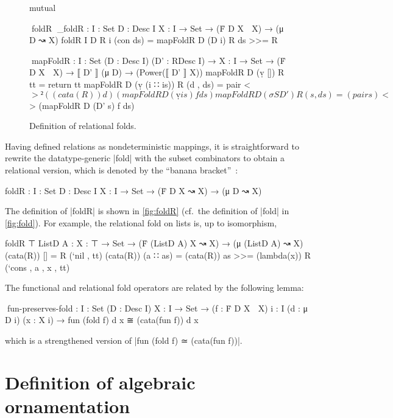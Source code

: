 \begin{figure}
\codefigure
\begin{code}
mutual

  ^^^foldR ^^^_foldR :  {I : Set} {D : Desc I} {X : I → Set} → (Ḟ D X ↝ X) → (μ D ↝ X)
  foldR {I} {D} R {i} (con ds) = mapFoldR D (D i) R ds >>= R

  ^^^mapFoldR :  {I : Set} (D : Desc I) (D' : RDesc I) →
                 {X : I → Set} → (Ḟ D X ↝ X) → ⟦ D' ⟧ (μ D) → (Power(⟦ D' ⟧ X))
  mapFoldR D (ṿ [])        R tt         = return tt
  mapFoldR D (ṿ (i ∷ is))  R (d  , ds)  = pair <$>²  ((cata(R)) d)
                                                     (mapFoldR D (ṿ is) f ds)
  mapFoldR D (σ S D')      R (s  , ds)  = (pair s) <$> (mapFoldR D (D' s) f ds)
\end{code}
\caption{Definition of relational folds.}
\label{fig:foldR}
\end{figure}

Having defined relations as nondeterministic mappings, it is straightforward to rewrite the datatype-generic |fold| with the subset combinators to obtain a relational version, which is denoted by the ``banana bracket''~\citep{Meijer-bananas}:
\begin{code}
foldR :  {I : Set} {D : Desc I} {X : I → Set} → (Ḟ D X ↝ X) → (μ D ↝ X)
\end{code}
The definition of |foldR| is shown in \autoref{fig:foldR} (cf.~the definition of |fold| in \autoref{fig:fold}).
For example, the relational fold on lists is, up to isomorphism,
\begin{code}
foldR {⊤} {ListD A} :  {X : ⊤ → Set} →
                       (Ḟ (ListD A) X ↝ X) → (μ (ListD A) ↝ X)
(cata(R)) []        =   R (`nil , tt)
(cata(R)) (a ∷ as)  =   (cata(R)) as >>= (lambda(x)) R (`cons , a , x , tt)
\end{code}
The functional and relational fold operators are related by the following lemma:
\begin{code}
^^^fun-preserves-fold :  {I : Set} (D : Desc I) {X : I → Set} →
                         (f : Ḟ D X ⇉ X) {i : I} (d : μ D i) (x : X i) →
                         fun (fold f) d x ≅ (cata(fun f)) d x
\end{code}
which is a strengthened version of |fun (fold f) ≃ (cata(fun f))|.

\section{Definition of algebraic ornamentation}
\label{sec:algOD}


